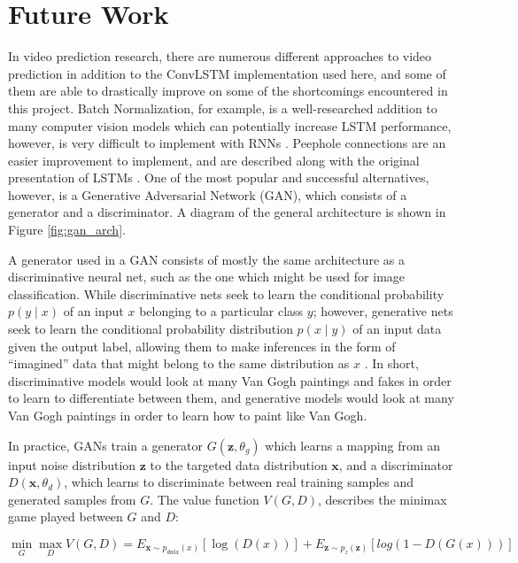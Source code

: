 \documentclass{scrartcl}
\begin{document}
\newpage
\section{Future Work}
\label{sec:future_work}

In video prediction research, there are numerous different approaches to video
prediction in addition to the ConvLSTM implementation used here, and some of
them are able to drastically improve on some of the shortcomings encountered in
this project. Batch Normalization, for example, is a well-researched addition
to many computer vision models which can potentially increase LSTM performance,
however, is very difficult to implement with RNNs \cite{batchnorm}. Peephole
connections are an easier improvement to implement, and are described along
with the original presentation of LSTMs \cite{lstm_original}. One of the most
popular and successful alternatives, however, is a Generative Adversarial
Network (GAN), which consists of a generator and a discriminator. A diagram of
the general architecture is shown in Figure \ref{fig:gan_arch}.

A generator used in a GAN consists of mostly the same architecture as a
discriminative neural net, such as the one which might be used for image
classification. While discriminative nets seek to learn the conditional
probability $p(y \mid x)$ of an input $x$ belonging to a particular class $y$;
however, generative nets seek to learn the conditional probability distribution
$p(x \mid y)$ of an input data given the output label, allowing them to make
inferences in the form of ``imagined'' data that might belong to the same
distribution as $x$ \cite{gan_original}. In short, discriminative models would
look at many Van Gogh paintings and fakes in order to learn to differentiate
between them, and generative models would look at many Van Gogh paintings in
order to learn how to paint like Van Gogh. 

In practice, GANs train a generator $G (\boldsymbol{z}, \theta_g)$ which learns
a mapping from an input noise distribution $\boldsymbol{z}$ to the targeted
data distribution $\boldsymbol{x}$, and a discriminator $D (\boldsymbol{x},
\theta_d)$, which learns to discriminate between real training samples and
generated samples from $G$. The value function $V(G, D)$, describes the minimax
game played between $G$ and $D$: 

\begin{equation}
	\min_G \max_D V(G, D) = E_{\boldsymbol{x} \sim p_{data} (x)} [ \log (D(x)) ] 
	+ E_{\boldsymbol{z} \sim p_z (\boldsymbol{z})} [ log(1 - D(G(x))) ] 
	\label{eq:gan_value_function}
\end{equation}
\end{document}

